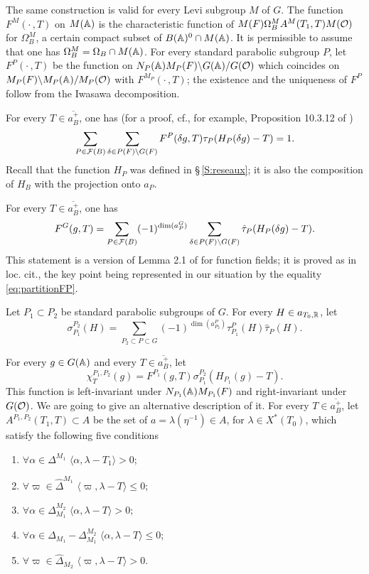 \begin{paragr}
The same construction is valid for every Levi subgroup $M$ of $G$. The function $F^M(\cdot\,,T)$ on $M(\mathbb{A})$ is the characteristic function of $M(F)\Omega_B^M A^M(T_1,T)M(\mathcal{O})$ for $\Omega_B^M$, a certain compact subset of $B(\mathbb{A})^0\cap M(\mathbb{A})$. It is permissible to assume that one has $\Omega_B^M=\Omega_B\cap M(\mathbb{A})$. For every standard parabolic subgroup $P$, let $F^P(\cdot\,,T)$ be the function on $N_P(\mathbb{A})M_P(F)\backslash G(\mathbb{A})/G(\mathcal{O})$ which coincides on $M_P(F)\backslash M_P(\mathbb{A})/M_P(\mathcal{O})$ with $F^{M_P}(\cdot\,,T)$; the existence and the uniqueness of $F^P$ follow from the Iwasawa decomposition.

For every $T\in \overline{a_B^+}$, one has (for a proof, cf., for example, Proposition 10.3.12 of \cite{laumon-drinfeld})
\begin{equation}
  \label{eq:partitionFP}
  \sum_{P\in \mathcal{F}(B)} \sum_{\delta\in P(F)\backslash G(F)} F^P(\delta g,T)\tau_P(H_P(\delta g)-T)=1.
\end{equation}
Recall that the function $H_P$ was defined in \S\,\ref{S:reseaux}; it is also the composition of $H_B$ with the projection onto $a_P$.

For every $T\in \overline{a_B^+}$, one has
$$F^G(g,T)=\sum_{P\in \mathcal{F}(B)} (-1)^{\dim(a_P^G)} \sum_{\delta\in P(F)\backslash G(F)} \hat{\tau}_P(H_P(\delta g)-T).$$
This statement is a version of Lemma 2.1 of \cite{ar-mesure} for function fields; it is proved as in loc. cit., the key point being represented in our situation by the equality \eqref{eq:partitionFP}.

Let $P_1\subset P_2$ be standard parabolic subgroups of $G$. For every $H\in a_{T_0,\mathbb{R}}$, let
$$\sigma_{P_1}^{P_2}(H)=\sum_{P_2\subset P\subset G} (-1)^{\dim(a_{P_2}^P)}\tau_{P_1}^P(H)\hat{\tau}_P(H).$$

For every $g\in G(\mathbb{A})$ and every $T\in \overline{a_B^+}$, let
$$\chi_T^{P_1,P_2}(g)=F^{P_1}(g,T)\sigma_{P_1}^{P_2}(H_{P_1}(g)-T).$$
This function is left-invariant under $N_{P_1}(\mathbb{A})M_{P_1}(F)$ and right-invariant under $G(\mathcal{O})$. We are going to give an alternative description of it. For every $T\in \overline{a_B^+}$, let $A^{P_1,P_2}(T_1,T)\subset A$ be the set of $a=\lambda(\eta^{-1})\in A$, for $\lambda\in X^*(T_0)$, which satisfy the following five conditions
\begin{enumerate}
\item $\forall \alpha\in \Delta^{M_1}$ \quad $\langle \alpha,\lambda-T_1\rangle >0$;
\item $\forall \varpi\in \hat{\Delta}^{M_1}$ \quad $\langle \varpi,\lambda-T\rangle \leq 0$;
\item $\forall \alpha\in \Delta_{M_1}^{M_2}$ \quad $\langle \alpha,\lambda-T\rangle >0$;
\item $\forall \alpha\in \Delta_{M_1}-\Delta_{M_1}^{M_2}$ \quad $\langle \alpha,\lambda-T\rangle \leq 0$;
\item $\forall \varpi\in \hat{\Delta}_{M_2}$ \quad $\langle \varpi,\lambda-T\rangle >0$.
\end{enumerate}


\end{paragr}
